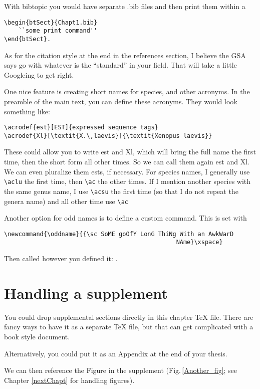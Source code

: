 With bibtopic you would have separate .bib files and then print them within a 
\begin{verbatim}
\begin{btSect}{Chapt1.bib}
	``some print command''
\end{btSect}.
\end{verbatim}

As for the citation style at the end in the references section, I believe the GSA says go with whatever is the ``standard'' in your field. That will take a little Googleing to get right. 

\clearpage %

One nice feature is creating short names for species, and other acronyms. In the preamble of the main text, you can define these acronyms. They would look something like:
\begin{verbatim}
\acrodef{est}[EST]{expressed sequence tags}
\acrodef{Xl}[\textit{X.\,laevis}]{\textit{Xenopus laevis}}
\end{verbatim}

These could allow you to write \ac{est} and \acl{Xl}, which will bring the full name the first time, then the short form all other times. So we can call them again \ac{est} and \ac{Xl}. We can even pluralize them \acp{est}, if necessary. For species names, I generally use \verb+\aclu+ the first time, then \verb+\ac+ the other times. If I mention another species with the same genus name, I use \verb+\acsu+ the first time (so that I do not repeat the genera name) and all other time use \verb+\ac+

Another option for odd names is to define a custom command. This is set with
\begin{verbatim}
\newcommand{\oddname}{{\sc SoME goOfY LonG ThiNg With an AwkWarD 
                                                NAme}\xspace}
\end{verbatim}

Then called however you defined it: \oddname.

\section{Handling a supplement}

You could drop supplemental sections directly in this chapter \TeX{} file. There are fancy ways to have it as a separate \TeX{} file, but that can get complicated with a book style document. 

Alternatively, you could put it as an Appendix at the end of your thesis. 

We can then reference the Figure in the supplement (Fig.\,\ref{Another_fig}; see Chapter \ref{nextChapt} for handling figures). 










